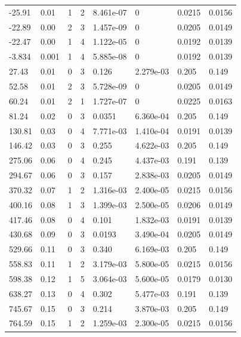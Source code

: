 \documentclass[preview]{standalone}
\begin{document}
{{\begin{tabular}{L{1.2cm}C{1.2cm} C{0.3cm}C{0.5cm} C{1.4cm}C{1.4cm} C{1.4cm}C{1.4cm}}
  -25.91  &  0.01  & 1     &  2 &  8.461e-07  & 0  & 0.0215 &  0.0156   \\ 
  -22.89  &  0.00  & 2     &  3 &  1.457e-09  & 0  & 0.0205 &  0.0149   \\ 
  -22.47  &  0.00  & 1     &  4 &  1.122e-05  & 0  & 0.0192 &  0.0139   \\ 
  -3.834  &  0.001  & 1     &  4 &  5.885e-08  & 0  & 0.0192 &  0.0139   \\ 
  27.43  &  0.01  & 0     &  3 &  0.126  & 2.279e-03  & 0.205 &  0.149   \\ 
  52.58  &  0.01  & 2     &  3 &  5.728e-09  & 0  & 0.0205 &  0.0149   \\ 
  60.24  &  0.01  & 2     &  1 &  1.727e-07  & 0  & 0.0225 &  0.0163   \\ 
  81.24  &  0.02  & 0     &  3 &  0.0351  & 6.360e-04  & 0.205 &  0.149   \\ 
  130.81  &  0.03  & 0     &  4 &  7.771e-03  & 1.410e-04  & 0.0191 &  0.0139   \\ 
  146.42  &  0.03  & 0     &  3 &  0.255  & 4.622e-03  & 0.205 &  0.149   \\ 
  275.06  &  0.06  & 0     &  4 &  0.245  & 4.437e-03  & 0.191 &  0.139   \\ 
  294.67  &  0.06  & 0     &  3 &  0.157  & 2.838e-03  & 0.0205 &  0.0149   \\ 
  370.32  &  0.07  & 1     &  2 &  1.316e-03  & 2.400e-05  & 0.0215 &  0.0156   \\ 
  400.16  &  0.08  & 1     &  3 &  1.399e-03  & 2.500e-05  & 0.0206 &  0.0149   \\ 
  417.46  &  0.08  & 0     &  4 &  0.101  & 1.832e-03  & 0.0191 &  0.0139   \\ 
  430.68  &  0.09  & 0     &  3 &  0.0193  & 3.490e-04  & 0.0205 &  0.0149   \\ 
  529.66  &  0.11  & 0     &  3 &  0.340  & 6.169e-03  & 0.205 &  0.149   \\ 
  558.83  &  0.11  & 1     &  2 &  3.179e-03  & 5.800e-05  & 0.0215 &  0.0156   \\ 
  598.38  &  0.12  & 1     &  5 &  3.064e-03  & 5.600e-05  & 0.0179 &  0.0130   \\ 
  638.27  &  0.13  & 0     &  4 &  0.302  & 5.477e-03  & 0.191 &  0.139   \\ 
  745.67  &  0.15  & 0     &  3 &  0.214  & 3.870e-03  & 0.205 &  0.149   \\ 
  764.59  &  0.15  & 1     &  2 &  1.259e-03  & 2.300e-05  & 0.0215 &  0.0156   \\ 

\end{tabular}}}
\end{document}
